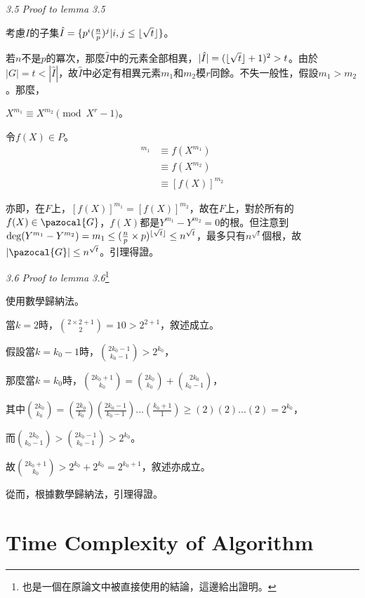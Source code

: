 \documentclass{article}
\DeclarePairedDelimiter\floor{\lfloor}{\rfloor}
\newcommand{\Ih}{\hat{I}}
\newcommand{\Gc}{\pazocal{G}}
\begin{document}
 \vspace{12pt} 

\noindent\textit{3.5 Proof to lemma 3.5}

    考慮$I$的子集$\Ih=\{p^i(\frac{n}{p})^j|i,j\leq\floor{\sqrt{t}}\}$。
    
    若$n$不是$p$的冪次，那麼$\Ih$中的元素全部相異，$|\Ih|=(\floor{\sqrt{t}}+1)^2>t$。由於$|G|=t<|\Ih|$，故$\Ih$中必定有相異元素$m_1$和$m_2$模$r$同餘。不失一般性，假設$m_1>m_2$。那麼，\\
    \centerline{$X^{m_1}\equiv X^{m_2}\pmod{X^r-1}$。}

    令$f(X)\in P$。
    \begin{align*}
    [f(X)]^{m_1}&\equiv f(X^{m_1})\\
                &\equiv f(X^{m_2})\\
                &\equiv [f(X)]^{m_2}
    \end{align*}

    亦即，在$F$上，$[f(X)]^{m_1}=[f(X)]^{m_2}$，故在$F$上，對於所有的$f(X)\in\Gc$，$f(X)$都是$Y^{m_1}-Y^{m_2}=0$的根。但注意到$\deg(Y^{m_1}-Y^{m_2})=m_1\leq(\frac{n}{p}\times p)^{\floor{\sqrt{t}}}\leq n^{\sqrt{t}}$，最多只有$n^{\sqrt{t}}$個根，故$|\Gc|\leq n^{\sqrt{t}}$。引理得證。

 \vspace{12pt} 

\noindent\textit{3.6 Proof to lemma 3.6}\footnote{也是一個在原論文中被直接使用的結論，這邊給出證明。}

    使用數學歸納法。

    當$k=2$時，$\binom{2\times 2+1}{2}=10>2^{2+1}$，敘述成立。

    假設當$k=k_0-1$時，$\binom{2k_0-1}{k_0-1}>2^{k_0}$，

    那麼當$k=k_0$時，$\binom{2k_0+1}{k_0}=\binom{2k_0}{k_0}+\binom{2k_0}{k_0-1}$，

    其中$\binom{2k_0}{k_0}=(\frac{2k_0}{k_0})(\frac{2k_0-1}{k_0-1})...(\frac{k_0+1}{1})\geq(2)(2)...(2)=2^{k_0}$，
    
    而$\binom{2k_0}{k_0-1}>\binom{2k_0-1}{k_0-1}>2^{k_0}$。

    故$\binom{2k_0+1}{k_0}>2^{k_0}+2^{k_0}=2^{k_0+1}$，敘述亦成立。

    從而，根據數學歸納法，引理得證。

\section{Time Complexity of Algorithm}
\end{document}
